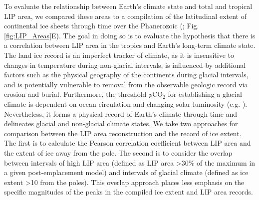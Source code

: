 \documentclass[11pt,letterpaper]{article}
\begin{document}
To evaluate the relationship between Earth's climate state and total and tropical LIP area, we compared these areas to a compilation of the latitudinal extent of continental ice sheets through time over the Phanerozoic (\citealp{Macdonald2019a}; Fig. \ref{fig:LIP_Areas}E). The goal in doing so is to evaluate the hypothesis that there is a correlation between LIP area in the tropics and Earth's long-term climate state. The land ice record is an imperfect tracker of climate, as it is insensitive to changes in temperature during non-glacial intervals, is influenced by additional factors such as the physical geography of the continents during glacial intervals, and is potentially vulnerable to removal from the observable geologic record via erosion and burial. Furthermore, the threshold \textit{p}CO$_2$ for establishing a glacial climate is dependent on ocean circulation and changing solar luminosity (e.g. \citealp{Shevenell2004a, DeConto2008a}). Nevertheless, it forms a physical record of Earth's climate through time and delineates glacial and non-glacial climate states. We take two approaches for comparison between the LIP area reconstruction and the record of ice extent. The first is to calculate the Pearson correlation coefficient between LIP area and the extent of ice away from the pole. The second is to consider the overlap between intervals of high LIP area (defined as LIP area \textgreater30\% of the maximum in a given post-emplacement model) and intervals of glacial climate (defined as ice extent \textgreater10\textdegree\xspace from the poles). This overlap approach places less emphasis on the specific magnitudes of the peaks in the compiled ice extent and LIP area records.
\end{document}
